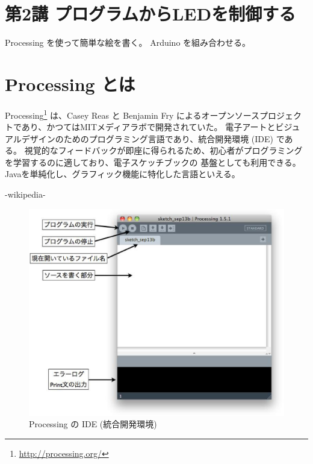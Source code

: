 \documentclass[11pt,a4paper]{jarticle}
\begin{document}
\section*{\LARGE{第2講 プログラムからLEDを制御する}}
Processing を使って簡単な絵を書く。
 Arduino を組み合わせる。



\section{Processing とは}
Processing\footnote{\url{http://processing.org/}} は、Casey Reas と Benjamin Fry によるオープンソースプロジェクトであり、かつてはMITメディアラボで開発されていた。
電子アートとビジュアルデザインのためのプログラミング言語であり、統合開発環境 (IDE) である。 視覚的なフィードバックが即座に得られるため、初心者がプログラミングを学習するのに適しており、電子スケッチブックの
基盤としても利用できる。
Javaを単純化し、グラフィック機能に特化した言語といえる。

\begin{flushright}
 -wikipedia-
\end{flushright}


\begin{figure}[h]
 \centering
 \includegraphics[width=0.5\columnwidth]{img/processing_ide.eps}
 \caption{Processing の IDE (統合開発環境)}
\end{figure}
\end{document}
